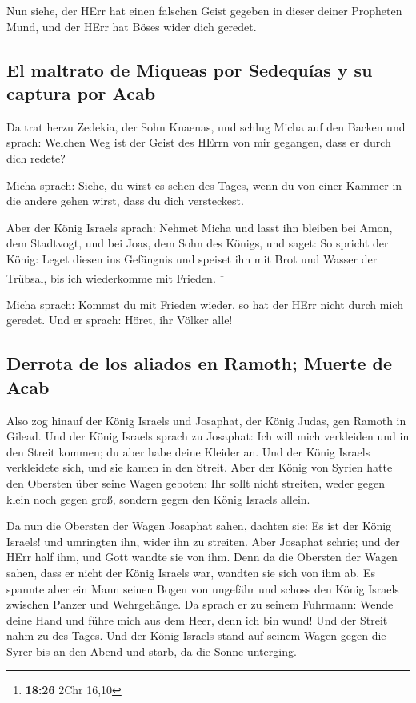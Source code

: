  Nun siehe, der HErr hat einen falschen Geist gegeben in
dieser deiner Propheten Mund, und der HErr hat Böses wider dich geredet.

\hypertarget{el-maltrato-de-miqueas-por-sedequuxedas-y-su-captura-por-acab}{%
\subsection{El maltrato de Miqueas por Sedequías y su captura por
Acab}\label{el-maltrato-de-miqueas-por-sedequuxedas-y-su-captura-por-acab}}

 Da trat herzu Zedekia, der Sohn Knaenas, und schlug
Micha auf den Backen und sprach: Welchen Weg ist der Geist des HErrn von
mir gegangen, dass er durch dich redete?

 Micha sprach: Siehe, du wirst es sehen des Tages, wenn
du von einer Kammer in die andere gehen wirst, dass du dich versteckest.

 Aber der König Israels sprach: Nehmet Micha und lasst
ihn bleiben bei Amon, dem Stadtvogt, und bei Joas, dem Sohn des Königs,
 und saget: So spricht der König: Leget diesen ins
Gefängnis und speiset ihn mit Brot und Wasser der Trübsal, bis ich
wiederkomme mit Frieden. \footnote{\textbf{18:26} 2Chr 16,10}

 Micha sprach: Kommst du mit Frieden wieder, so hat der
HErr nicht durch mich geredet. Und er sprach: Höret, ihr Völker alle!

\hypertarget{derrota-de-los-aliados-en-ramoth-muerte-de-acab}{%
\subsection{Derrota de los aliados en Ramoth; Muerte de
Acab}\label{derrota-de-los-aliados-en-ramoth-muerte-de-acab}}

 Also zog hinauf der König Israels und Josaphat, der
König Judas, gen Ramoth in Gilead.  Und der König Israels
sprach zu Josaphat: Ich will mich verkleiden und in den Streit kommen;
du aber habe deine Kleider an. Und der König Israels verkleidete sich,
und sie kamen in den Streit.  Aber der König von Syrien
hatte den Obersten über seine Wagen geboten: Ihr sollt nicht streiten,
weder gegen klein noch gegen groß, sondern gegen den König Israels
allein.

 Da nun die Obersten der Wagen Josaphat sahen, dachten
sie: Es ist der König Israels! und umringten ihn, wider ihn zu streiten.
Aber Josaphat schrie; und der HErr half ihm, und Gott wandte sie von
ihm.  Denn da die Obersten der Wagen sahen, dass er nicht
der König Israels war, wandten sie sich von ihm ab.  Es
spannte aber ein Mann seinen Bogen von ungefähr und schoss den König
Israels zwischen Panzer und Wehrgehänge. Da sprach er zu seinem
Fuhrmann: Wende deine Hand und führe mich aus dem Heer, denn ich bin
wund!  Und der Streit nahm zu des Tages. Und der König
Israels stand auf seinem Wagen gegen die Syrer bis an den Abend und
starb, da die Sonne unterging.

